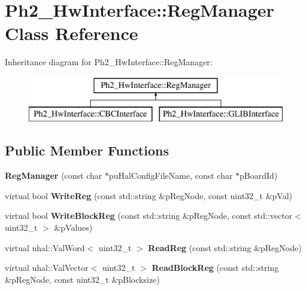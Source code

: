 \hypertarget{class_ph2___hw_interface_1_1_reg_manager}{\section{Ph2\-\_\-\-Hw\-Interface\-:\-:Reg\-Manager Class Reference}
\label{class_ph2___hw_interface_1_1_reg_manager}
}
Inheritance diagram for Ph2\-\_\-\-Hw\-Interface\-:\-:Reg\-Manager\-:\begin{figure}[H]
\begin{center}
\leavevmode
\includegraphics[height=2.000000cm]{class_ph2___hw_interface_1_1_reg_manager}
\end{center}
\end{figure}
\subsection*{Public Member Functions}
\begin{DoxyCompactItemize}
\item 
\hypertarget{class_ph2___hw_interface_1_1_reg_manager_a2af587b23e2ab0e8be35feac45a61d34}{{\bfseries Reg\-Manager} (const char $\ast$pu\-Hal\-Config\-File\-Name, const char $\ast$p\-Board\-Id)}\label{class_ph2___hw_interface_1_1_reg_manager_a2af587b23e2ab0e8be35feac45a61d34}

\item 
\hypertarget{class_ph2___hw_interface_1_1_reg_manager_a31174516fef6706c88c3f59dd93e4fdf}{virtual bool {\bfseries Write\-Reg} (const std\-::string \&p\-Reg\-Node, const uint32\-\_\-t \&p\-Val)}\label{class_ph2___hw_interface_1_1_reg_manager_a31174516fef6706c88c3f59dd93e4fdf}

\item 
\hypertarget{class_ph2___hw_interface_1_1_reg_manager_a888f5cccb05daa28896cf622abfdcbd6}{virtual bool {\bfseries Write\-Block\-Reg} (const std\-::string \&p\-Reg\-Node, const std\-::vector$<$ uint32\-\_\-t $>$ \&p\-Values)}\label{class_ph2___hw_interface_1_1_reg_manager_a888f5cccb05daa28896cf622abfdcbd6}

\item 
\hypertarget{class_ph2___hw_interface_1_1_reg_manager_a077e0a18592206365150680213345112}{virtual uhal\-::\-Val\-Word$<$ uint32\-\_\-t $>$ {\bfseries Read\-Reg} (const std\-::string \&p\-Reg\-Node)}\label{class_ph2___hw_interface_1_1_reg_manager_a077e0a18592206365150680213345112}

\item 
\hypertarget{class_ph2___hw_interface_1_1_reg_manager_a6481c211d27badc409ff0e7af20575e4}{virtual uhal\-::\-Val\-Vector$<$ uint32\-\_\-t $>$ {\bfseries Read\-Block\-Reg} (const std\-::string \&p\-Reg\-Node, const uint32\-\_\-t \&p\-Blocksize)}\label{class_ph2___hw_interface_1_1_reg_manager_a6481c211d27badc409ff0e7af20575e4}

\end{DoxyCompactItemize}
